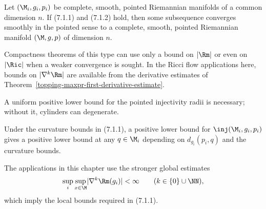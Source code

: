 \begin{theorem}
\label{topping-ch7-compactness-manifolds}

Let $(\M_i,g_i,p_i)$ be complete, smooth, pointed Riemannian manifolds of a
common dimension $n$. If (7.1.1) and (7.1.2) hold, then some subsequence
converges smoothly in the pointed sense to a complete, smooth, pointed
Riemannian manifold $(\M,g,p)$ of dimension $n$.
\end{theorem}

\begin{remark}
\label{topping-ch7-curvature-control-needed}
Compactness theorems of this type can use only a bound on $\lvert\Rm\rvert$ or
even on $\lvert\Ric\rvert$ when a weaker convergence is sought. In the Ricci
flow applications here, bounds on $\lvert\nabla^k\Rm\rvert$ are available from
the derivative estimates of Theorem~\ref{topping-maxpr-first-derivative-estimate}.
\end{remark}

\begin{remark}
\label{topping-ch7-injectivity-radius-needed}
A uniform positive lower bound for the pointed injectivity radii is necessary;
without it, cylinders can degenerate.
\end{remark}

\begin{remark}
\label{topping-ch7-injectivity-radius-propagation}
Under the curvature bounds in (7.1.1), a positive lower bound for
$\inj(\M_i,g_i,p_i)$ gives a positive lower bound at any $q\in\M_i$ depending
on $d_{g_i}(p_i,q)$ and the curvature bounds.
\end{remark}

\begin{remark}
\label{topping-ch7-compactness-usage}
The applications in this chapter use the stronger global estimates
\[
\sup_i\sup_{x\in\M}\lvert\nabla^k\Rm(g_i)\rvert<\infty
\qquad (k\in\{0\}\cup\NN),
\]
which imply the local bounds required in (7.1.1).
\end{remark}

